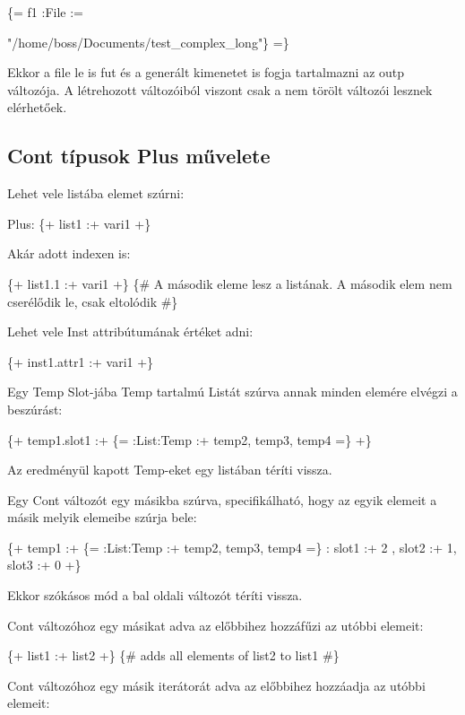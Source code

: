 \{= f1 :File := {"/home/boss/Documents/test\_complex\_long"\} =\}

Ekkor a file le is fut és a generált kimenetet is fogja tartalmazni az outp változója.
A létrehozott változóiból viszont csak a nem törölt változói lesznek elérhetőek.



\subsection{Cont típusok Plus művelete}
Lehet vele listába elemet szúrni:

Plus: \{+ list1 :+ vari1 +\}

Akár adott indexen is:

\{+ list1.1 :+ vari1 +\} 
\{\# A második eleme lesz a listának. 
A második elem nem cserélődik le, csak eltolódik \#\}

Lehet vele Inst attribútumának értéket adni:

\{+ inst1.attr1 :+ vari1 +\} 

Egy Temp Slot-jába Temp tartalmú Listát szúrva annak minden elemére elvégzi a beszúrást:

\{+ temp1.slot1 :+ \{= :List:Temp :+ temp2, temp3, temp4 =\} +\} 

Az eredményül kapott Temp-eket egy listában téríti vissza.
 
Egy Cont változót egy másikba szúrva, specifikálható, hogy az egyik elemeit a másik melyik elemeibe szúrja bele:

\{+ temp1 :+ \{= :List:Temp :+ temp2, temp3, temp4 =\} : slot1 :+ 2 , slot2 :+ 1, slot3 :+ 0   +\} 

Ekkor szókásos mód a bal oldali változót téríti vissza. 

Cont változóhoz egy másikat adva az előbbihez hozzáfűzi az utóbbi elemeit:

\{+ list1 :+ list2 +\} \{\# adds all elements of list2 to list1 \#\}

Cont változóhoz egy másik iterátorát adva az előbbihez hozzáadja az utóbbi elemeit:

}
